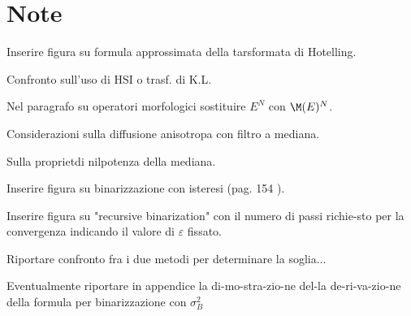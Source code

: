 \chapter{Note}

\bi

\im Inserire figura su formula approssimata della tarsformata di Hotelling.

\im Confronto sull'uso di HSI o trasf. di K.L.

\im Nel paragrafo su operatori morfologici sostituire $E^N$ con $\M(E)^N$.

\im Considerazioni sulla diffusione anisotropa con filtro a mediana.

\im Sulla propriet\a di nilpotenza della mediana.

\im Inserire figura su binarizzazione con isteresi (pag. 154 \cite{Zamperoni}). 

\im Inserire figura su "recursive binarization" con il numero di passi richie-sto
    per la convergenza indicando il valore di $\varepsilon$ fissato.

\im Riportare confronto fra i due metodi per determinare la soglia...

\im Eventualmente riportare in appendice la di-mo-stra-zio-ne del-la de-ri-va-zio-ne
    della formula per binarizzazione con $\sigma_B^2$

\ei


